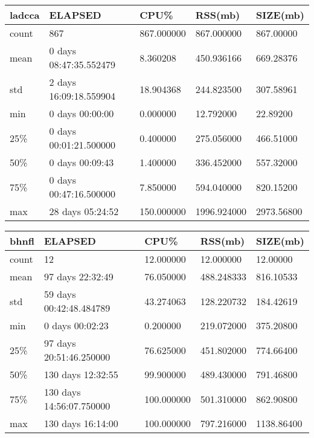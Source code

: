 \documentclass{article}
\begin{document}
\begin{tabular}{|l|l|l|l|l|}
\hline 
\hline ladcca& ELAPSED&   CPU\%&  RSS(mb)&   SIZE(mb) \\
\hline count&    867& 867.000000&  867.000000&  867.00000 \\
\hline mean&  0 days 08:47:35.552479&  8.360208&  450.936166&  669.28376 \\
\hline std&  2 days 16:09:18.559904&  18.904368&  244.823500&  307.58961 \\
\hline min&   0 days 00:00:00&  0.000000&  12.792000&  22.89200 \\
\hline 25\%&  0 days 00:01:21.500000&  0.400000&  275.056000&  466.51000 \\
\hline 50\%&   0 days 00:09:43&  1.400000&  336.452000&  557.32000 \\
\hline 75\%&  0 days 00:47:16.500000&  7.850000&  594.040000&  820.15200 \\
\hline max&  28 days 05:24:52& 150.000000& 1996.924000& 2973.56800 \\
\hline 
\end{tabular}
 
\begin{tabular}{|l|l|l|l|l|}
\hline 
\hline bhnfl&    ELAPSED&   CPU\%&   RSS(mb)&   SIZE(mb) \\
\hline count&    12&  12.000000&  12.000000&  12.00000 \\
\hline mean&   97 days 22:32:49&  76.050000& 488.248333&  816.10533 \\
\hline std&   59 days 00:42:48.484789&  43.274063& 128.220732&  184.42619 \\
\hline min&    0 days 00:02:23&  0.200000& 219.072000&  375.20800 \\
\hline 25\%&   97 days 20:51:46.250000&  76.625000& 451.802000&  774.66400 \\
\hline 50\%&   130 days 12:32:55&  99.900000& 489.430000&  791.46800 \\
\hline 75\%&  130 days 14:56:07.750000& 100.000000& 501.310000&  862.90800 \\
\hline max&   130 days 16:14:00& 100.000000& 797.216000& 1138.86400 \\
\hline 
\end{tabular}
 
\end{document}
